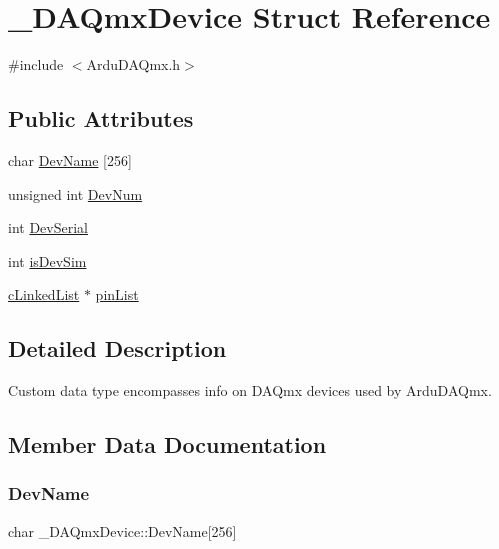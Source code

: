 \hypertarget{struct___d_a_qmx_device}{}\section{\+\_\+\+D\+A\+Qmx\+Device Struct Reference}
\label{struct___d_a_qmx_device}


{\ttfamily \#include $<$Ardu\+D\+A\+Qmx.\+h$>$}

\subsection*{Public Attributes}
\begin{DoxyCompactItemize}
\item 
char \mbox{\hyperlink{struct___d_a_qmx_device_aea90e1108c697c8d6db821d21aabd58d}{Dev\+Name}} \mbox{[}256\mbox{]}
\item 
unsigned int \mbox{\hyperlink{struct___d_a_qmx_device_a6daae65b3caf69476dcdd3d9a790d29d}{Dev\+Num}}
\item 
int \mbox{\hyperlink{struct___d_a_qmx_device_aa08a5a76d6516ab92a7c608a4e98a9f3}{Dev\+Serial}}
\item 
int \mbox{\hyperlink{struct___d_a_qmx_device_a02d188ae3809b065b00d6e02d9ed93fc}{is\+Dev\+Sim}}
\item 
\mbox{\hyperlink{c_linked_list_8h_aac1ab3387f7254e06b22dc5a54f2e5f6}{c\+Linked\+List}} $\ast$ \mbox{\hyperlink{struct___d_a_qmx_device_afa73f79090ac9fd75a0e23e6d6d94f6a}{pin\+List}}
\end{DoxyCompactItemize}


\subsection{Detailed Description}
Custom data type encompasses info on D\+A\+Qmx devices used by Ardu\+D\+A\+Qmx. 

\subsection{Member Data Documentation}
\mbox{\label{struct___d_a_qmx_device_aea90e1108c697c8d6db821d21aabd58d}} 
\subsubsection{\texorpdfstring{Dev\+Name}{DevName}}
{\footnotesize\ttfamily char \+\_\+\+D\+A\+Qmx\+Device\+::\+Dev\+Name\mbox{[}256\mbox{]}}

